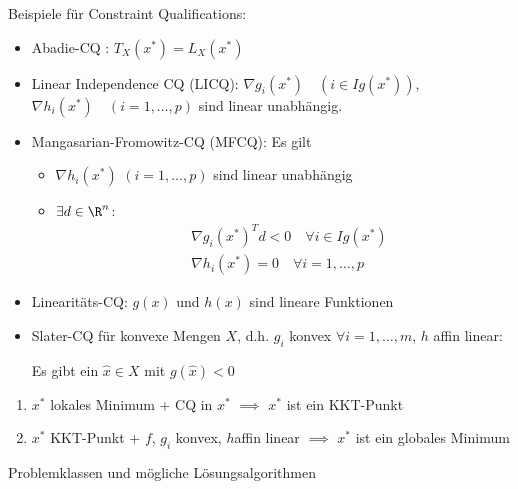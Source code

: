 Beispiele für Constraint Qualifications:
\begin{itemize}
	\item Abadie-CQ : $T_{X}(x^{*})=L_{X}({x}^{*})$
	\item Linear Independence CQ (LICQ): $ \nabla g_{i}({x}^{*})\quad (i \in Ig({x}^{*}) )$, $\nabla h_{i}({x}^{*}) \quad (i=1, \ldots, p)$ sind linear unabhängig.
	\item Mangasarian-Fromowitz-CQ (MFCQ): Es gilt
		\begin{itemize}
			\item $\nabla h_{i}({x}^{*})$ $(i=1, \ldots, p)$ sind linear unabhängig
			\item $\exists d \in \R^{n}$:
				\begin{align*}
				&\nabla g_{i}({x}^{*})^{T}d < 0 \quad \forall i \in Ig({x}^{*}) \\
				&\nabla h_{i}({x}^{*})=0\quad \forall i=1, \ldots, p
				\end{align*}
		\end{itemize}
	\item Linearitäts-CQ: $g(x)$ und $h(x)$ sind lineare Funktionen
	\item Slater-CQ für konvexe Mengen $X$, d.h. $g_{i}$ konvex $\forall i=1, \ldots, m$, $h$ affin linear:

		Es gibt ein $\hat{x} \in X$ mit $g(\hat{x})<0$
\end{itemize}

\begin{satz}
\label{thm:optinumsatzletzter}
\begin{enumerate}[label=(\alph{enumi})]
	\item ${x}^{*}$ lokales Minimum + CQ in ${x}^{*}$ $\implies$ ${x}^{*}$ ist ein KKT-Punkt
	\item ${x}^{*}$ KKT-Punkt + $f$, $g_{i}$ konvex, $h$affin linear $\implies$ ${x}^{*}$ ist ein globales Minimum
\end{enumerate}
\end{satz}

Problemklassen und mögliche Lösungsalgorithmen

